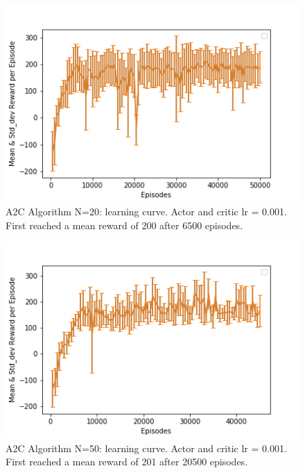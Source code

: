 \documentclass[12pt]{article}
\begin{document}
\begin{enumerate}
			\begin{figure}[H]
				\begin{center} 
					\includegraphics[scale=.73]{figures/A2C_LC_N=20_50.png}
				\end{center}
				\caption{A2C Algorithm N=20: learning curve. Actor and critic lr = 0.001. First reached a mean reward of 200 after 6500 episodes. } 	\label{3}%
			\end{figure}
			\begin{figure}[H]
				\begin{center} 
					\includegraphics[scale=.73]{figures/A2C_LC_N=50_45.png}
				\end{center}
				\caption{A2C Algorithm N=50: learning curve. Actor and critic lr = 0.001. First reached a mean reward of 201 after 20500 episodes. } 	\label{4}%
			\end{figure}
        

\end{enumerate}
\end{document}
